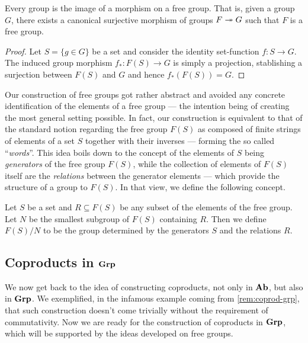 \begin{proposition}
\label{prop:free-group-factorization}
Every group is the image of a morphism on a free group. That is, given a group
\(G\), there exists a canonical surjective morphism of groups \(F \twoheadrightarrow G\)
such that \(F\) is a free group.
\end{proposition}

\begin{proof}
Let \(S = \{g \in G\}\) be a set and consider the identity set-function \(f: S \to
G\). The induced group morphism \(f_{*}: F(S) \to G\) is simply a projection,
stablishing a surjection between \(F(S)\) and \(G\) and hence \(f_{*}(F(S)) =
G\).
\end{proof}

Our construction of free groups got rather abstract and avoided any concrete
identification of the elements of a free group --- the intention being of
creating the most general setting possible. In fact, our construction is
equivalent to that of the standard notion regarding the free group \(F(S)\) as
composed of finite strings of elements of a set \(S\) together with their
inverses --- forming the so called ``\emph{words}''. This idea boils down to the
concept of the elements of \(S\) being \emph{generators} of the free group
\(F(S)\), while the collection of elements of \(F(S)\) itself are the
\emph{relations} between the generator elements --- which provide the structure
of a group to \(F(S)\). In that view, we define the following concept.

\begin{definition}
\label{def:grp-determined-generators-relations}
Let \(S\) be a set and \(R \subseteq F(S)\) be any subset of the elements of the
free group. Let \(N\) be the smallest subgroup of \(F(S)\) containing
\(R\). Then we define \(F(S)/N\) to be the group determined by the generators
\(S\) and the relations \(R\).
\end{definition}

\subsection{Coproducts in \texorpdfstring{\({\textbf{Grp}}\)}{Grp}}

We now get back to the idea of constructing coproducts, not only in \({\textbf{Ab}}\), but
also in \({\textbf{Grp}}\). We exemplified, in the infamous example coming from
\cref{rem:coprod-grp}, that such construction doesn't come trivially without
the requirement of commutativity. Now we are ready for the construction of
coproducts in \({\textbf{Grp}}\), which will be supported by the ideas developed on free
groups.

